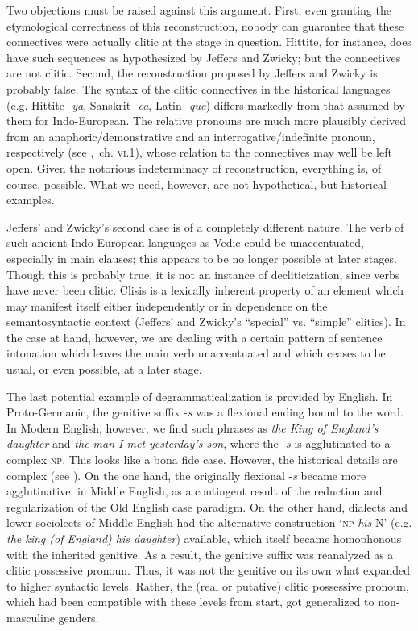 Two objections must be raised against this argument. First, even granting the etymological correctness of this reconstruction, nobody can guarantee that these connectives were actually clitic at the stage in question. Hittite, for instance, does have such sequences as hypothesized by Jeffers and Zwicky; but the connectives are not clitic. Second, the reconstruction proposed by Jeffers and Zwicky is probably false. The syntax of the clitic connectives in the historical languages (e.g. Hittite -\textit{ya}, Sanskrit -\textit{ca}, Latin -\textit{que}) differs markedly from that assumed by them for Indo-European. The relative pronouns are much more plausibly derived from an anaphoric/demonstrative and an interrogative/indefinite pronoun, respectively (see \citet{Lehmann1984},~ch. \textsc{vi}.1), whose relation to the connectives may well be left open. Given the notorious indeterminacy of reconstruction, everything is, of course, possible. What we need, however, are not hypothetical, but historical examples.

Jeffers' and Zwicky's second case is of a completely different nature. The verb of such ancient Indo-European languages as Vedic could be unaccentuated, especially in main clauses; this appears to be no longer possible at later stages. Though this is probably true, it is not an instance of decliticization, since verbs have never been clitic. Clisis is a lexically inherent property of an element which may manifest itself either independently or in dependence on the semantosyntactic context (Jeffers' and Zwicky's “special” vs. “simple” clitics). In the case at hand, however, we are dealing with a certain pattern of sentence intonation which leaves the main verb unaccentuated and which ceases to be usual, or even possible, at a later stage.

The last potential example of degrammaticalization is provided by English. In Proto-Germanic, the genitive suffix -\textit{s} was a flexional ending bound to the word. In Modern English, however, we find such phrases as \textit{the King of England's daughter} and \textit{the man I met yesterday's son}, where the -\textit{s} is agglutinated to a complex \textsc{np}. This looks like a bona fide case. However, the historical details are complex (see \citet{Janda1980}). On the one hand, the originally flexional -\textit{s} became more agglutinative, in Middle English, as a contingent result of the reduction and regularization of the Old English case paradigm. On the other hand, dialects and lower sociolects of Middle English had the alternative construction ‘\textsc{np} \textit{his} N’ (e.g. \textit{the king (of England) his daughter}) available, which itself became homophonous with the inherited genitive. As a result, the genitive suffix was reanalyzed as a clitic possessive pronoun. Thus, it was not the genitive on its own what expanded to higher syntactic levels. Rather, the (real or putative) clitic possessive pronoun, which had been compatible with these levels from start, got generalized to non-masculine genders.

